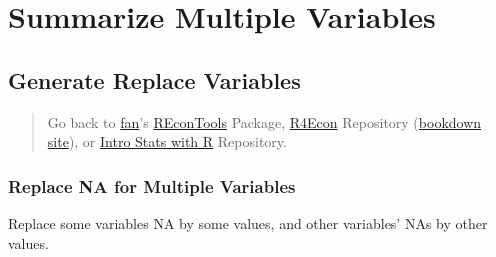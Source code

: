 \documentclass[
]{book}
\newenvironment{Shaded}{\begin{snugshade}}{\end{snugshade}}
\newcommand{\CommentTok}[1]{\textcolor[rgb]{0.56,0.35,0.01}{\textit{#1}}}
\newcommand{\DataTypeTok}[1]{\textcolor[rgb]{0.13,0.29,0.53}{#1}}
\newcommand{\DecValTok}[1]{\textcolor[rgb]{0.00,0.00,0.81}{#1}}
\newcommand{\KeywordTok}[1]{\textcolor[rgb]{0.13,0.29,0.53}{\textbf{#1}}}
\newcommand{\NormalTok}[1]{#1}
\newcommand{\OperatorTok}[1]{\textcolor[rgb]{0.81,0.36,0.00}{\textbf{#1}}}
\newcommand{\OtherTok}[1]{\textcolor[rgb]{0.56,0.35,0.01}{#1}}
\newcommand{\StringTok}[1]{\textcolor[rgb]{0.31,0.60,0.02}{#1}}
\begin{document}
\hypertarget{summarize-multiple-variables}{%
\section{Summarize Multiple Variables}\label{summarize-multiple-variables}}

\hypertarget{generate-replace-variables}{%
\subsection{Generate Replace Variables}\label{generate-replace-variables}}

\begin{quote}
Go back to \href{http://fanwangecon.github.io/CodeDynaAsset/}{fan}'s \href{https://fanwangecon.github.io/REconTools/}{REconTools} Package, \href{https://fanwangecon.github.io/R4Econ/}{R4Econ} Repository (\href{https://fanwangecon.github.io/R4Econ/bookdown}{bookdown site}), or \href{https://fanwangecon.github.io/Stat4Econ/}{Intro Stats with R} Repository.
\end{quote}

\hypertarget{replace-na-for-multiple-variables}{%
\subsubsection{Replace NA for Multiple Variables}\label{replace-na-for-multiple-variables}}

Replace some variables NA by some values, and other variables' NAs by other values.

\begin{Shaded}
\end{Shaded}
\end{document}
